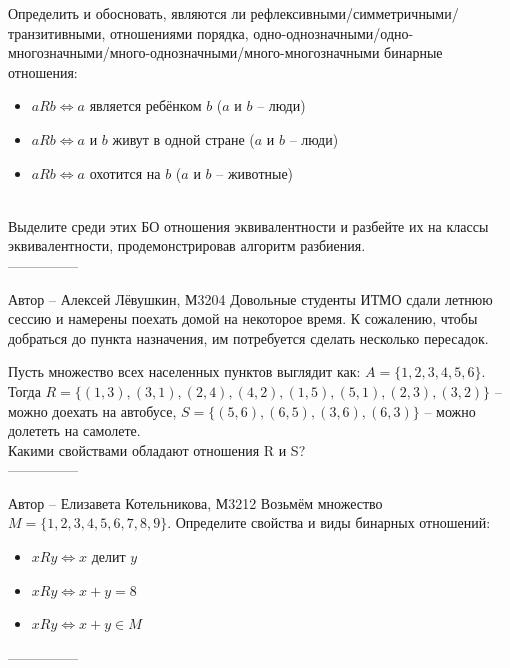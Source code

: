 \documentclass[10pt]{exam}
\begin{document}
\begin{questions}
\question
Определить и обосновать, являются ли рефлексивными/симметричными/транзитивными, отношениями порядка, одно-однозначными/одно-многозначными/много-однозначными/много-многозначными бинарные отношения:
\begin{itemize}
    \item $aRb \Leftrightarrow a$ является ребёнком $b$ ($a$ и $b$ -- люди)
    \item $aRb \Leftrightarrow a$ и $b$ живут в одной стране ($a$ и $b$ -- люди)
    \item $aRb \Leftrightarrow a$ охотится на $b$ ($a$ и $b$ -- животные)
\end{itemize}
\\
Выделите среди этих БО отношения эквивалентности и разбейте их на классы эквивалентности, продемонстрировав алгоритм разбиения.
\\
---------------

Автор -- Алексей Лёвушкин, М3204\question
Довольные студенты ИТМО сдали летнюю сессию и намерены поехать домой на некоторое время. К сожалению, чтобы добраться до пункта назначения, им потребуется сделать несколько пересадок.

Пусть множество всех населенных пунктов выглядит как: $A = \{1, 2, 3, 4, 5, 6\}$.
\\
Тогда $R = \{(1, 3), (3, 1), (2, 4), (4, 2), (1, 5), (5, 1), (2, 3), (3, 2)\}$ -- можно доехать на автобусе, $S = \{(5, 6), (6, 5), (3, 6), (6, 3)\}$ -- можно долететь на самолете.
\\
Какими свойствами обладают отношения R и S?
\\
---------------

Автор -- Елизавета Котельникова, М3212\question
Возьмём множество $M = \{1, 2, 3, 4, 5, 6, 7, 8, 9\}$. Определите свойства и виды бинарных отношений:
\begin{itemize}
    \item $xRy \Leftrightarrow x$ делит $y$
    \item $xRy \Leftrightarrow x + y = 8$
    \item $xRy \Leftrightarrow x + y \in M$
\end{itemize}
---------------


\end{questions}
\end{document}
